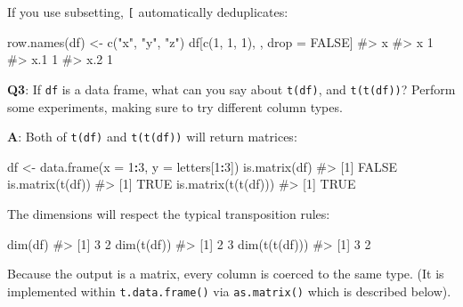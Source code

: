 \documentclass[
]{krantz}
\makeatletter
\newenvironment{Shaded}{\begin{snugshade}}{\end{snugshade}}
\newcommand{\CommentTok}[1]{\textcolor[rgb]{0.56,0.35,0.01}{\textit{#1}}}
\newcommand{\DataTypeTok}[1]{\textcolor[rgb]{0.13,0.29,0.53}{#1}}
\newcommand{\DecValTok}[1]{\textcolor[rgb]{0.00,0.00,0.81}{#1}}
\newcommand{\KeywordTok}[1]{\textcolor[rgb]{0.13,0.29,0.53}{\textbf{#1}}}
\newcommand{\NormalTok}[1]{#1}
\newcommand{\OperatorTok}[1]{\textcolor[rgb]{0.81,0.36,0.00}{\textbf{#1}}}
\newcommand{\OtherTok}[1]{\textcolor[rgb]{0.56,0.35,0.01}{#1}}
\newcommand{\StringTok}[1]{\textcolor[rgb]{0.31,0.60,0.02}{#1}}
\newenvironment{kframe}{%
\medskip{}
\setlength{\fboxsep}{.8em}
 \def\at@end@of@kframe{}%
 \ifinner\ifhmode%
  \def\at@end@of@kframe{\end{minipage}}%
  \begin{minipage}{\columnwidth}%
 \fi\fi%
 \def\FrameCommand##1{\hskip\@totalleftmargin \hskip-\fboxsep
 \colorbox{shadecolor}{##1}\hskip-\fboxsep
     \hskip-\linewidth \hskip-\@totalleftmargin \hskip\columnwidth}%
 \MakeFramed {\advance\hsize-\width
   \@totalleftmargin\z@ \linewidth\hsize
   \@setminipage}}%
 {\par\unskip\endMakeFramed%
 \at@end@of@kframe}
\renewenvironment{Shaded}{\begin{kframe}}{\end{kframe}}
\renewcommand{\KeywordTok} [1]{\textcolor[rgb]{0.00,0.44,0.13}{{#1}}}
\renewcommand{\DataTypeTok}[1]{\textcolor[rgb]{0.56,0.13,0.00}{{#1}}}
\renewcommand{\DecValTok}  [1]{\textcolor[rgb]{0.25,0.63,0.44}{{#1}}}
\renewcommand{\StringTok}  [1]{\textcolor[rgb]{0.25,0.44,0.63}{{#1}}}
\renewcommand{\CommentTok} [1]{\textcolor[rgb]{0.38,0.63,0.69}{{#1}}}
\renewcommand{\OtherTok}   [1]{\textcolor[rgb]{0.00,0.44,0.13}{{#1}}}
\renewcommand{\NormalTok}  [1]{{#1}}
\makeatother
\begin{document}
If you use subsetting, \texttt{{[}} automatically deduplicates:

\begin{Shaded}
\begin{Highlighting}[]
\KeywordTok{row.names}\NormalTok{(df) <-}\StringTok{ }\KeywordTok{c}\NormalTok{(}\StringTok{"x"}\NormalTok{, }\StringTok{"y"}\NormalTok{, }\StringTok{"z"}\NormalTok{)}
\NormalTok{df[}\KeywordTok{c}\NormalTok{(}\DecValTok{1}\NormalTok{, }\DecValTok{1}\NormalTok{, }\DecValTok{1}\NormalTok{), , drop =}\StringTok{ }\OtherTok{FALSE}\NormalTok{]}
\CommentTok{#>     x}
\CommentTok{#> x   1}
\CommentTok{#> x.1 1}
\CommentTok{#> x.2 1}
\end{Highlighting}
\end{Shaded}

\textbf{{Q3}}: If \texttt{df} is a data frame, what can you say about \texttt{t(df)}, and \texttt{t(t(df))}? Perform some experiments, making sure to try different column types.

\textbf{{A}}: Both of \texttt{t(df)} and \texttt{t(t(df))} will return matrices:

\begin{Shaded}
\begin{Highlighting}[]
\NormalTok{df <-}\StringTok{ }\KeywordTok{data.frame}\NormalTok{(}\DataTypeTok{x =} \DecValTok{1}\OperatorTok{:}\DecValTok{3}\NormalTok{, }\DataTypeTok{y =}\NormalTok{ letters[}\DecValTok{1}\OperatorTok{:}\DecValTok{3}\NormalTok{])}
\KeywordTok{is.matrix}\NormalTok{(df)}
\CommentTok{#> [1] FALSE}
\KeywordTok{is.matrix}\NormalTok{(}\KeywordTok{t}\NormalTok{(df))}
\CommentTok{#> [1] TRUE}
\KeywordTok{is.matrix}\NormalTok{(}\KeywordTok{t}\NormalTok{(}\KeywordTok{t}\NormalTok{(df)))}
\CommentTok{#> [1] TRUE}
\end{Highlighting}
\end{Shaded}

The dimensions will respect the typical transposition rules:

\begin{Shaded}
\begin{Highlighting}[]
\KeywordTok{dim}\NormalTok{(df)}
\CommentTok{#> [1] 3 2}
\KeywordTok{dim}\NormalTok{(}\KeywordTok{t}\NormalTok{(df))}
\CommentTok{#> [1] 2 3}
\KeywordTok{dim}\NormalTok{(}\KeywordTok{t}\NormalTok{(}\KeywordTok{t}\NormalTok{(df)))}
\CommentTok{#> [1] 3 2}
\end{Highlighting}
\end{Shaded}

Because the output is a matrix, every column is coerced to the same type. (It is implemented within \texttt{t.data.frame()} via \texttt{as.matrix()} which is described below).
\end{document}
